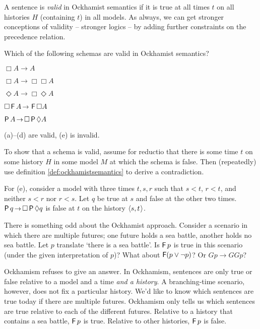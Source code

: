 
A sentence is \emph{valid} in Ockhamist semantics if it is true at all times $t$
on all histories $H$ (containing $t$) in all models. As always, we can get
stronger conceptions of validity -- stronger logics -- by adding further
constraints on the precedence relation.


\begin{exercise}
  Which of the following schemas are valid in Ockhamist semantics?
  \begin{exlist}
  \item $\Box A \to A$
  \item $\Box A \to \Box\Box A$
  \item $\Diamond A \to \Box\Diamond A$
  \item $\Box \tF A \to \tF\Box A$
  \item $\tP A \to \Box \tP \Diamond A$%
  \end{exlist}
\end{exercise}
\begin{solution}
  (a)--(d) are valid, (e) is invalid.

  To show that a schema is valid, assume for reductio that there is some time
  $t$ on some history $H$ in some model $M$ at which the schema is false. Then
  (repeatedly) use definition \ref{def:ockhamistsemantics} to derive a
  contradiction.

  For (e), consider a model with three times $t,s,r$ such that $s < t$,
  $r< t$, and neither $s < r$ nor $r< s$. Let $q$ be true at $s$ and
  false at the other two times. $\tP q \to \Box \tP \Diamond q$ is false at $t$
  on the history $\t{s,t}$.
\end{solution}

There is something odd about the Ockhamist approach. Consider a scenario in
which there are multiple futures; one future holds a sea battle, another holds
no sea battle. Let $p$ translate `there is a sea battle'. Is $\operatorname{\mathsf{F}} p$ is true in
this scenario (under the given interpretation of $p$)? What about
$\operatorname{\mathsf{F}}(p \lor \neg p)$? Or $Gp \to GGp$?

Ockhamism refuses to give an answer. In Ockhamism, sentences are only true or
false relative to a model and a time \emph{and a history}. A branching-time
scenario, however, does not fix a particular history. We'd like to know which
sentences are true today if there are multiple futures. Ockhamism only tells us
which sentences are true relative to each of the different futures. Relative to
a history that contains a sea battle, $\operatorname{\mathsf{F}} p$ is true. Relative to other
histories, $\operatorname{\mathsf{F}} p$ is false.

